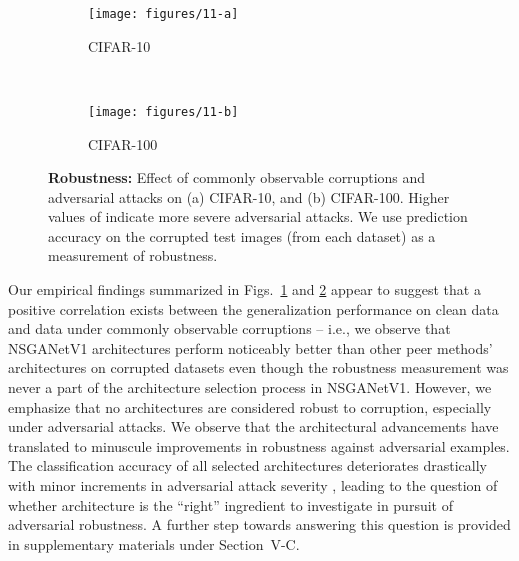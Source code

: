 \documentclass[journal]{IEEEtran}
\def\ourmethod{NSGANetV1}
\theoremstyle{definition}
\theoremstyle{remark}
\begin{document}
\begin{figure}[t]
	\centering
	\begin{subfigure}[t]{.45\textwidth}
		\centering
		\texttt{[image: figures/11-a]}
		\caption{CIFAR-10\label{fig:cifar10_robustness_adv}}
	\end{subfigure}\\
	\begin{subfigure}[t]{.45\textwidth}
		\centering
		\texttt{[image: figures/11-b]}
		\caption{CIFAR-100\label{fig:cifar100_robustness_adv}}
	\end{subfigure}
	\caption{\textbf{Robustness:} Effect of commonly observable corruptions and adversarial attacks on (a) CIFAR-10, and (b) CIFAR-100. Higher values of  indicate more severe adversarial attacks. {We use prediction accuracy on the corrupted test images (from each dataset) as a measurement of robustness.}
	\label{fig:robustness}\vspace{-0.3cm}}
\end{figure}

Our empirical findings summarized in Figs.~\ref{fig:cifar10_robustness_adv} and \ref{fig:cifar100_robustness_adv} appear to suggest that a positive correlation exists between the generalization performance on clean data and data under commonly observable corruptions -- i.e., we observe that \ourmethod{} architectures perform noticeably better than other peer methods' architectures on corrupted datasets even though the robustness measurement was never a part of the architecture selection process in \ourmethod{}. However, we emphasize that no architectures are considered robust to corruption, especially under adversarial attacks. We observe that the architectural advancements have translated to minuscule improvements in robustness against adversarial examples. The classification accuracy of all selected architectures deteriorates drastically with minor increments in adversarial attack severity , leading to the question of whether architecture is the ``right'' ingredient to investigate in pursuit of adversarial robustness. A further step towards answering this question is provided in supplementary materials {under} Section~V-C.



\vspace{-2mm}
\end{document}
